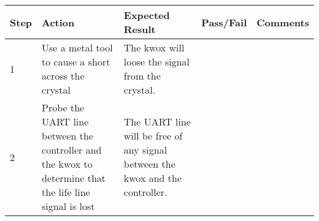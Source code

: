 \documentclass[]{article}
\begin{document}
\begin{longtable}[c]{@{}lllll@{}}
\toprule
\begin{minipage}[b]{0.06\columnwidth}\raggedright\strut
Step
\strut\end{minipage} &
\begin{minipage}[b]{0.08\columnwidth}\raggedright\strut
Action
\strut\end{minipage} &
\begin{minipage}[b]{0.19\columnwidth}\raggedright\strut
Expected Result
\strut\end{minipage} &
\begin{minipage}[b]{0.12\columnwidth}\raggedright\strut
Pass/Fail
\strut\end{minipage} &
\begin{minipage}[b]{0.11\columnwidth}\raggedright\strut
Comments
\strut\end{minipage}\tabularnewline
\midrule
\endhead
\begin{minipage}[t]{0.06\columnwidth}\raggedright\strut
1
\strut\end{minipage} &
\begin{minipage}[t]{0.08\columnwidth}\raggedright\strut
Use a metal tool to cause a short across the crystal
\strut\end{minipage} &
\begin{minipage}[t]{0.19\columnwidth}\raggedright\strut
The kwox will loose the signal from the crystal.
\strut\end{minipage} &
\begin{minipage}[t]{0.12\columnwidth}\raggedright\strut
\strut\end{minipage} &
\begin{minipage}[t]{0.11\columnwidth}\raggedright\strut
\strut\end{minipage}\tabularnewline
\begin{minipage}[t]{0.06\columnwidth}\raggedright\strut
2
\strut\end{minipage} &
\begin{minipage}[t]{0.08\columnwidth}\raggedright\strut
Probe the UART line between the controller and the kwox to determine
that the life line signal is lost
\strut\end{minipage} &
\begin{minipage}[t]{0.19\columnwidth}\raggedright\strut
The UART line will be free of any signal between the kwox and the
controller.
\strut\end{minipage} &
\begin{minipage}[t]{0.12\columnwidth}\raggedright\strut

\end{minipage}
\end{longtable}
\end{document}
